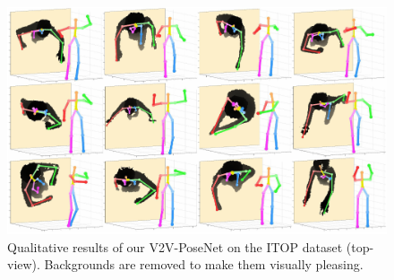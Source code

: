 \begin{figure}
\begin{center}
   \includegraphics[width=1.0\linewidth]{qualitative_itop_top.pdf}
\end{center}
\vspace*{-6mm}
   \caption{Qualitative results of our V2V-PoseNet on the ITOP dataset (top-view). Backgrounds are removed to make them visually pleasing.}
\vspace*{-3mm}
\label{fig:qualitative_itop_top}
\end{figure}